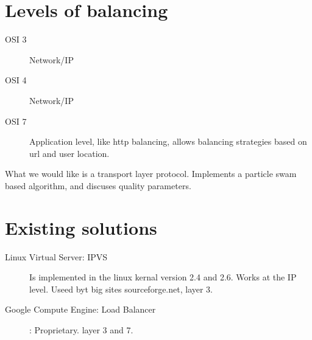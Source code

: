 \section{Levels of balancing}
\begin{description}
	\item[OSI 3] Network/IP %
	\item[OSI 4] Network/IP
	\item[OSI 7] {Application level, like http balancing, allows balancing strategies based on url and user location.}
\end{description}

What we would like is a transport layer protocol.
\cite{Ludwig:SwarmIntelligenceGridLoadBalancing} Implements a particle swam based algorithm, and discuses quality parameters.

\section{Existing solutions}
\begin{description}
	\item[Linux Virtual Server: IPVS] Is implemented in the linux kernal version 2.4 and 2.6. Works at the IP level. Useed byt big sites sourceforge.net, layer 3.
	\item[Google Compute Engine: Load Balancer]: Proprietary. layer 3 and 7.
\end{description}